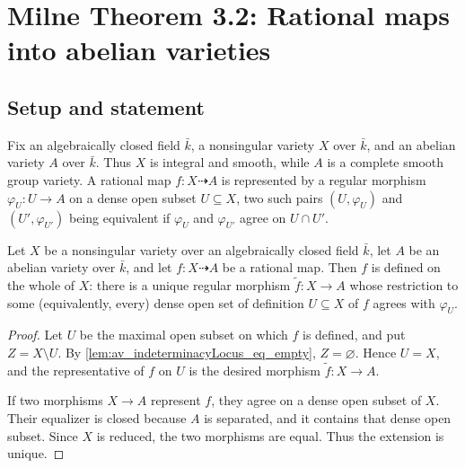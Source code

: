 \chapter{Milne Theorem 3.2: Rational maps into abelian varieties}
\label{chap:Albanese_Thm32RationalMapExtension}

\section{Setup and statement}
\label{sec:thm32_setup}

Fix an algebraically closed field \(\bar k\), a nonsingular variety \(X\) over
\(\bar k\), and an abelian variety \(A\) over \(\bar k\).  Thus \(X\) is
integral and smooth, while \(A\) is a complete smooth group variety.  A
rational map \(f \colon X \dashrightarrow A\) is represented by a regular
morphism \(\varphi_U \colon U \to A\) on a dense open subset
\(U \subseteq X\), two such pairs \((U, \varphi_U)\) and \((U', \varphi_{U'})\) being equivalent
if \(\varphi_U\) and \(\varphi_{U'}\) agree on \(U \cap U'\).

\begin{theorem}\leanok
  \label{thm:rational_map_to_av_extends}

  Let \(X\) be a nonsingular variety over an algebraically closed field \(\bar k\), let \(A\) be
  an abelian variety over \(\bar k\), and let \(f \colon X \dashrightarrow A\) be a rational
  map. Then \(f\) is defined on the whole of \(X\): there is a unique regular morphism
  \(\widetilde f \colon X \to A\) whose restriction to some (equivalently, every) dense open
  set of definition \(U \subseteq X\) of \(f\) agrees with \(\varphi_U\).
\end{theorem}

\begin{proof}
  Let \(U\) be the maximal open subset on which \(f\) is defined, and put
  \(Z=X\setminus U\).  By \cref{lem:av_indeterminacyLocus_eq_empty},
  \(Z=\varnothing\).  Hence \(U=X\), and the representative of \(f\) on
  \(U\) is the desired morphism \(\widetilde f\colon X\to A\).

  If two morphisms \(X\to A\) represent \(f\), they agree on a dense open
  subset of \(X\).  Their equalizer is closed because \(A\) is separated,
  and it contains that dense open subset.  Since \(X\) is reduced, the two
  morphisms are equal.  Thus the extension is unique.
\end{proof}

